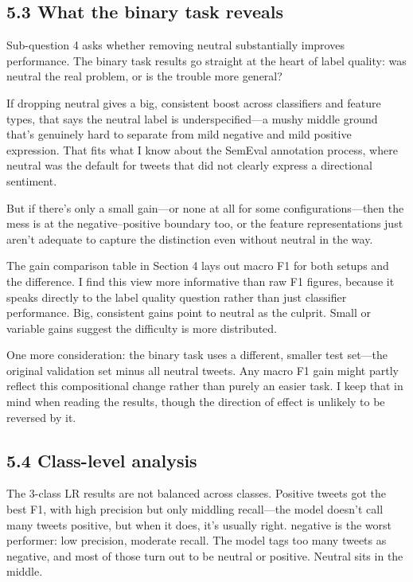 \documentclass[12pt]{article}
\begin{document}
\subsection*{5.3 What the binary task reveals}



Sub-question 4 asks whether removing neutral substantially improves performance. The binary task results go straight at the heart of label quality: was neutral the real problem, or is the trouble more general?

If dropping neutral gives a big, consistent boost across classifiers and feature types, that says the neutral label is underspecified---a mushy middle ground that's genuinely hard to separate from mild negative and mild positive expression. That fits what I know about the SemEval annotation process, where neutral was the default for tweets that did not clearly express a directional sentiment.

But if there's only a small gain---or none at all for some configurations---then the mess is at the negative--positive boundary too, or the feature representations just aren't adequate to capture the distinction even without neutral in the way.

The gain comparison table in Section 4 lays out macro F1 for both setups and the difference. I find this view more informative than raw F1 figures, because it speaks directly to the label quality question rather than just classifier performance. Big, consistent gains point to neutral as the culprit. Small or variable gains suggest the difficulty is more distributed.

One more consideration: the binary task uses a different, smaller test set---the original validation set minus all neutral tweets. Any macro F1 gain might partly reflect this compositional change rather than purely an easier task. I keep that in mind when reading the results, though the direction of effect is unlikely to be reversed by it.



\subsection*{5.4 Class-level analysis}



The 3-class LR results are not balanced across classes. Positive tweets got the best F1, with high precision but only middling recall---the model doesn't call many tweets positive, but when it does, it's usually right. negative is the worst performer: low precision, moderate recall. The model tags too many tweets as negative, and most of those turn out to be neutral or positive. Neutral sits in the middle.
\end{document}

